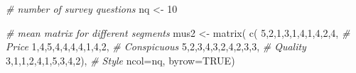 \documentclass[
  12pt,
]{krantz}
\makeatletter
\newenvironment{Shaded}{\begin{snugshade}}{\end{snugshade}}
\newcommand{\AttributeTok}[1]{\textcolor[rgb]{0.61,0.61,0.61}{#1}}
\newcommand{\CommentTok}[1]{\textcolor[rgb]{0.37,0.37,0.37}{\textit{#1}}}
\newcommand{\ConstantTok}[1]{\textcolor[rgb]{0,0,0}{#1}}
\newcommand{\DecValTok}[1]{\textcolor[rgb]{0.06,0.06,0.06}{#1}}
\newcommand{\FunctionTok}[1]{\textcolor[rgb]{0,0,0}{#1}}
\newcommand{\NormalTok}[1]{#1}
\newcommand{\OtherTok}[1]{\textcolor[rgb]{0.37,0.37,0.37}{#1}}
\newenvironment{kframe}{%
\medskip{}
\setlength{\fboxsep}{.8em}
 \def\at@end@of@kframe{}%
 \ifinner\ifhmode%
  \def\at@end@of@kframe{\end{minipage}}%
  \begin{minipage}{\columnwidth}%
 \fi\fi%
 \def\FrameCommand##1{\hskip\@totalleftmargin \hskip-\fboxsep
 \colorbox{shadecolor}{##1}\hskip-\fboxsep
     \hskip-\linewidth \hskip-\@totalleftmargin \hskip\columnwidth}%
 \MakeFramed {\advance\hsize-\width
   \@totalleftmargin\z@ \linewidth\hsize
   \@setminipage}}%
 {\par\unskip\endMakeFramed%
 \at@end@of@kframe}
\renewenvironment{Shaded}{\begin{kframe}}{\end{kframe}}
\makeatother
\begin{document}
\begin{Shaded}
\begin{Highlighting}[]
\CommentTok{\# number of survey questions}
\NormalTok{nq }\OtherTok{\textless{}{-}} \DecValTok{10}

\CommentTok{\# mean matrix for different segments }
\NormalTok{mus2 }\OtherTok{\textless{}{-}} \FunctionTok{matrix}\NormalTok{( }\FunctionTok{c}\NormalTok{( }\DecValTok{5}\NormalTok{,}\DecValTok{2}\NormalTok{,}\DecValTok{1}\NormalTok{,}\DecValTok{3}\NormalTok{,}\DecValTok{1}\NormalTok{,}\DecValTok{4}\NormalTok{,}\DecValTok{1}\NormalTok{,}\DecValTok{4}\NormalTok{,}\DecValTok{2}\NormalTok{,}\DecValTok{4}\NormalTok{, }\CommentTok{\# Price}
  \DecValTok{1}\NormalTok{,}\DecValTok{4}\NormalTok{,}\DecValTok{5}\NormalTok{,}\DecValTok{4}\NormalTok{,}\DecValTok{4}\NormalTok{,}\DecValTok{4}\NormalTok{,}\DecValTok{4}\NormalTok{,}\DecValTok{1}\NormalTok{,}\DecValTok{4}\NormalTok{,}\DecValTok{2}\NormalTok{, }\CommentTok{\# Conspicuous}
  \DecValTok{5}\NormalTok{,}\DecValTok{2}\NormalTok{,}\DecValTok{3}\NormalTok{,}\DecValTok{4}\NormalTok{,}\DecValTok{3}\NormalTok{,}\DecValTok{2}\NormalTok{,}\DecValTok{4}\NormalTok{,}\DecValTok{2}\NormalTok{,}\DecValTok{3}\NormalTok{,}\DecValTok{3}\NormalTok{, }\CommentTok{\# Quality}
  \DecValTok{3}\NormalTok{,}\DecValTok{1}\NormalTok{,}\DecValTok{1}\NormalTok{,}\DecValTok{2}\NormalTok{,}\DecValTok{4}\NormalTok{,}\DecValTok{1}\NormalTok{,}\DecValTok{5}\NormalTok{,}\DecValTok{3}\NormalTok{,}\DecValTok{4}\NormalTok{,}\DecValTok{2}\NormalTok{), }\CommentTok{\# Style}
\AttributeTok{ncol=}\NormalTok{nq, }\AttributeTok{byrow=}\ConstantTok{TRUE}\NormalTok{) }


\end{Highlighting}
\end{Shaded}
\end{document}
